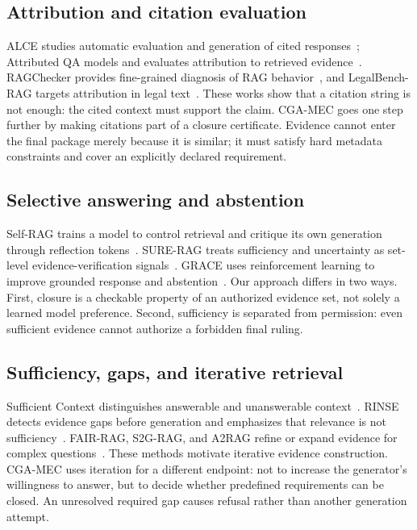 \documentclass[11pt]{article}
\newcommand{\method}{CGA-MEC}
\begin{document}
\subsection{Attribution and citation evaluation}

ALCE studies automatic evaluation and generation of cited responses~\citep{gao2023alce}; Attributed QA models and evaluates attribution to retrieved evidence~\citep{bohnet2022attributed}. RAGChecker provides fine-grained diagnosis of RAG behavior~\citep{ru2024ragchecker}, and LegalBench-RAG targets attribution in legal text~\citep{pipitone2024legalbench}. These works show that a citation string is not enough: the cited context must support the claim. \method{} goes one step further by making citations part of a closure certificate. Evidence cannot enter the final package merely because it is similar; it must satisfy hard metadata constraints and cover an explicitly declared requirement.

\subsection{Selective answering and abstention}

Self-RAG trains a model to control retrieval and critique its own generation through reflection tokens~\citep{asai2023selfrag}. SURE-RAG treats sufficiency and uncertainty as set-level evidence-verification signals~\citep{qiu2026surerag}. GRACE uses reinforcement learning to improve grounded response and abstention~\citep{zhao2026grace}. Our approach differs in two ways. First, closure is a checkable property of an authorized evidence set, not solely a learned model preference. Second, sufficiency is separated from permission: even sufficient evidence cannot authorize a forbidden final ruling.

\subsection{Sufficiency, gaps, and iterative retrieval}

Sufficient Context distinguishes answerable and unanswerable context~\citep{joren2024sufficient}. RINSE detects evidence gaps before generation and emphasizes that relevance is not sufficiency~\citep{chen2026rinse}. FAIR-RAG, S2G-RAG, and A2RAG refine or expand evidence for complex questions~\citep{asl2025fairrag,li2026s2g,liu2026a2rag}. These methods motivate iterative evidence construction. \method{} uses iteration for a different endpoint: not to increase the generator's willingness to answer, but to decide whether predefined requirements can be closed. An unresolved required gap causes refusal rather than another generation attempt.
\end{document}
